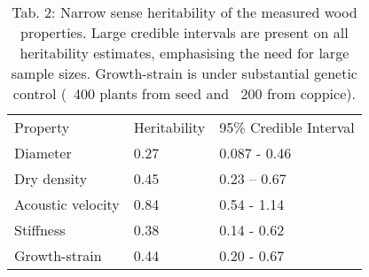 
\begin{table}[]
\centering
\caption{Tab. 2: Narrow sense heritability of the measured wood properties. Large credible intervals are present on all heritability estimates, emphasising the need for large sample sizes. Growth-strain is under substantial genetic control (~400 plants from seed and ~200 from coppice).}
\begin{tabular}{lll}
Property          & Heritability & 95\% Credible Interval \\
Diameter          & 0.27         & 0.087 - 0.46           \\
Dry density       & 0.45         & 0.23 – 0.67            \\
Acoustic velocity & 0.84         & 0.54 - 1.14            \\
Stiffness         & 0.38         & 0.14 - 0.62            \\
Growth-strain     & 0.44         & 0.20 - 0.67           
\end{tabular}
\end{table}